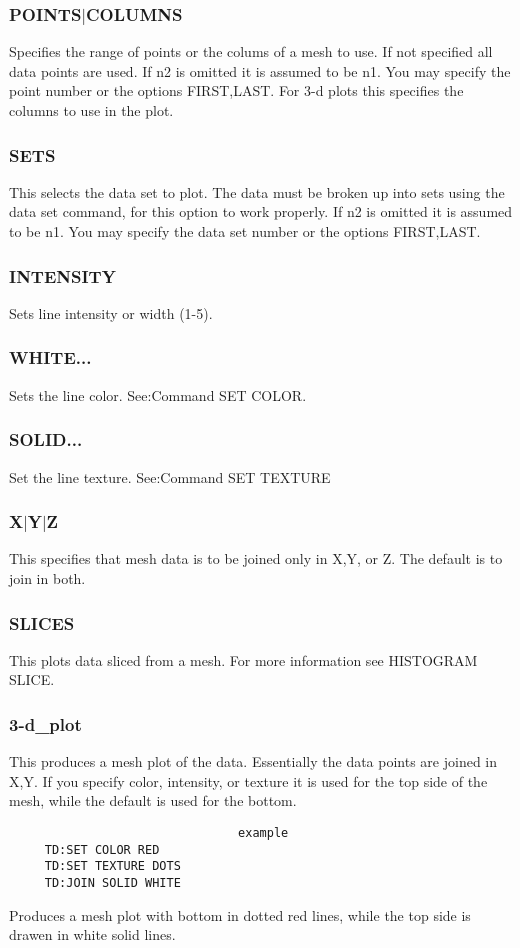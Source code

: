 \subsubsection{POINTS$|$COLUMNS}
Specifies  the  range of points or the colums of a mesh to use.  If not
specified all data points are used.  If n2 is omitted it is assumed  to
be  n1.   You  may  specify the point number or the options FIRST,LAST.
For 3-d plots this specifies the columns to use in the plot.  
\subsubsection{SETS}
This  selects  the  data  set to plot.  The data must be broken up into
sets using the data set command, for this option to work properly.   If
n2  is  omitted  it  is assumed to be n1.  You may specify the data set
number or the options FIRST,LAST.  
\subsubsection{INTENSITY}
Sets line intensity or width (1-5).  
\subsubsection{WHITE...}
Sets the line color.  See:Command SET COLOR.  
\subsubsection{SOLID...}
Set the line texture.  See:Command SET TEXTURE 
\subsubsection{X$|$Y$|$Z}
This  specifies  that mesh data is to be joined only in X,Y, or Z.  The
default is to join in both.  
\subsubsection{SLICES}
This plots data sliced from a mesh.  For more information see HISTOGRAM
SLICE.  
\subsubsection{3-d\_plot}
This produces a mesh plot of the data.  Essentially the data points are
joined in X,Y.  If you specify color, intensity, or texture it is  used
for the top side of the mesh, while the default is used for the bottom. 

\begin{verbatim}
                                example
     TD:SET COLOR RED 
     TD:SET TEXTURE DOTS 
     TD:JOIN SOLID WHITE 
\end{verbatim}
Produces  a  mesh  plot  with bottom in dotted red lines, while the top
side is drawen in white solid lines.  
